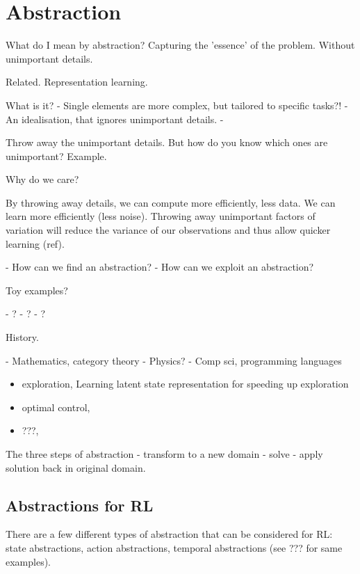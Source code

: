 \chapter{Abstraction}\label{C:abstraction}


What do I mean by abstraction?
Capturing the 'essence' of the problem. Without unimportant details.

Related. Representation learning.

What is it?
- Single elements are more complex, but tailored to specific tasks?!
- An idealisation, that ignores unimportant details.
-

Throw away the unimportant details. But how do you know which ones are unimportant?
Example.

Why do we care?

By throwing away details, we can compute more efficiently, less data.
We can learn more efficiently (less noise).
Throwing away unimportant factors of variation will reduce the variance of our
observations and thus allow quicker learning (ref).

- How can we find an abstraction?
- How can we exploit an abstraction?


Toy examples?

- ?
- ?
- ?

History.

- Mathematics, category theory
- Physics?
- Comp sci, programming languages



\begin{itemize}
\tightlist
\item
  exploration, Learning latent state representation for speeding up exploration \cite{Vezzani2019}
\item
  optimal control,
\item
  ???,
\end{itemize}


The three steps of abstraction - transform to a new domain
- solve - apply solution back in original domain.


\section{Abstractions for RL}

There are a few different types of abstraction that can be considered for RL:
state abstractions, action abstractions, temporal abstractions (see ??? for same examples).

